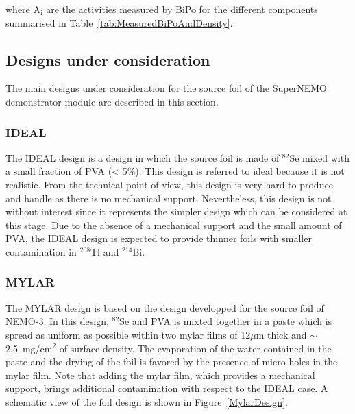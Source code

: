 \documentclass[main.tex]{subfiles}
\begin{document}
\NI where A$_\text{i}$ are the activities measured by BiPo for the different components summarised in Table~\ref{tab:MeasuredBiPoAndDensity}.


\subsection{Designs under consideration}\label{sec:designUnderConsideration}


\NI The main designs under consideration for the source foil of the SuperNEMO demonstrator module are described in this section. 


\subsubsection{IDEAL}


\NI The IDEAL design is a design in which the source foil is made of $^{\text{82}}$Se mixed with a small fraction of PVA (< 5\%). This design is referred to ideal because it is not realistic. From the technical point of view, this design is very hard to produce and handle as there is no mechanical support. Nevertheless, this design is not without interest since it represents the simpler design which can be considered at this stage. Due to the absence of a mechanical support and the small amount of PVA, the IDEAL design is expected to provide thinner foils with smaller contamination in $^{\text{208}}$Tl and $^{\text{214}}$Bi.


\subsubsection{MYLAR}


\NI The MYLAR design is based on the design developped for the source foil of NEMO-3. In this design, $^{\text{82}}$Se and PVA is mixted together in a paste which is spread as uniform as possible within two mylar films of 12$\mu$m thick and $\sim$2.5~mg/cm$^\text{2}$ of surface density. The evaporation of the water contained in the paste and the drying of the foil is favored by the presence of micro holes in the mylar film. Note that adding the mylar film, which provides a mechanical support, brings additional contamination with respect to the IDEAL case. A schematic view of the foil design is shown in Figure~\ref{MylarDesign}.
\end{document}
